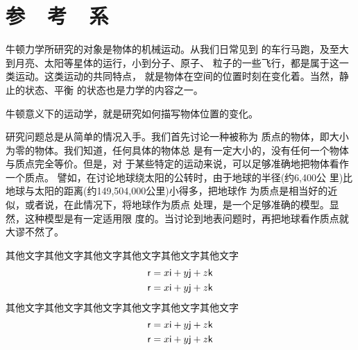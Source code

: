 \section[参考系]{参~~考~~系}
    牛顿力学所研究的对象是物体的机械运动。从我们日常见到
的车行马跑，及至大到月亮、太阳等星体的运行，小到分子、原子、
粒子的一些飞行，都是属于这一类运动。这类运动的共同特点，
就是物体在空间的位置时刻在变化着。当然，静止的状态、平衡
的状态也是力学的内容之一。

    牛顿意义下的运动学，就是研究如何描写物体位置的变化。

\renewcommand{\hsp}{\hspace{0.1em}}
    研究问题总是从简单的情况入手。我们首先讨论一种被称为
质点的物体，即大小为零的物体。我们知道，任何具体的物体总
是有一定大小的，没有任何一个物体与质点完全等价。但是，对
于某些特定的运动来说，可以足够准确地把物体看作一个质点。
譬如，在讨论地球绕太阳的公转时，由于地球的半径\hsp(约\hsp 6,400\hsp 公
里)\hsp 比地球与太阳的距离\hsp (约\hsp 149,504,000\hsp 公里)\hsp 小得多，把地球作
为质点是相当好的近似，或者说，在此情况下，将地球作为质点
处理，是一个足够准确的模型。显然，这种模型是有一定适用限
度的。当讨论到地表问题时，再把地球看作质点就大谬不然了。

其他文字其他文字其他文字其他文字其他文字其他文字
\begin{align}
    {\sf r}=x{\sf i}+y{\sf j}+z{\sf k}\\
    {\sf r}=x{\sf i}+y{\sf j}+z{\sf k}
\end{align}
其他文字其他文字其他文字其他文字其他文字其他文字
\begin{align}
    {\sf r}=x{\sf i}+y{\sf j}+z{\sf k}\\
    {\sf r}=x{\sf i}+y{\sf j}+z{\sf k}
\end{align}
